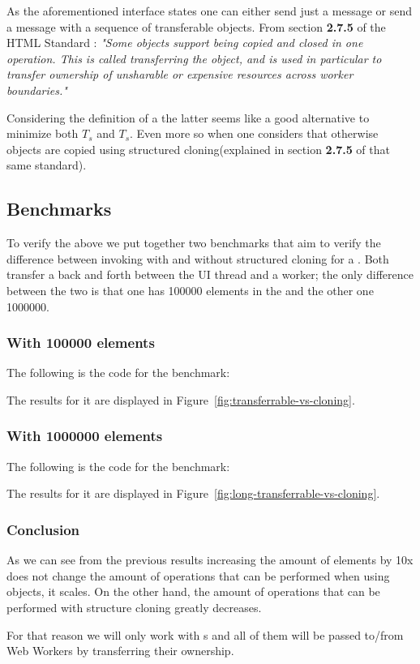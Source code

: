 As the aforementioned interface states one can either send just a message or send a message with a sequence of transferable objects. From section \textbf{2.7.5} of the HTML Standard \cite{html-whatwg}:
\textit{"Some objects support being copied and closed in one operation. This is called transferring the object, and is used in particular to transfer ownership of unsharable or expensive resources across worker boundaries."}

Considering the definition of a  the latter seems like a good alternative to minimize both \(T_{s}\) and \(T_{s}\). Even more so when one considers that otherwise objects are copied using structured cloning(explained in section \textbf{2.7.5} of that same standard).

\subsection{Benchmarks}
To verify the above we put together two benchmarks that aim to verify the difference between invoking  with and without structured cloning for a \ttarray{}. Both transfer a \ttarray{} back and forth between the UI thread and a worker; the only difference between the two is that one has 100000 elements in the \ttarray{} and the other one 1000000.

\subsubsection{With 100000 elements}
The following is the code for the benchmark:

The results for it are displayed in Figure~\ref{fig:transferrable-vs-cloning}.

\subsubsection{With 1000000 elements}
The following is the code for the benchmark:

The results for it are displayed in Figure~\ref{fig:long-transferrable-vs-cloning}.

\subsubsection{Conclusion}
As we can see from the previous results increasing the amount of elements by 10x does not change the amount of operations that can be performed when using  objects, it scales. On the other hand, the amount of operations that can be performed with structure cloning greatly decreases.

For that reason we will only work with {\ttarray{}}s and all of them will be passed to/from Web Workers by transferring their ownership.

\pagebreak
